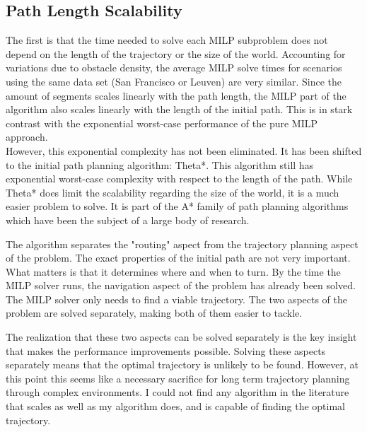 \subsection{Path Length Scalability}
The first is that the time needed to solve each MILP subproblem does not depend on the length of the trajectory or the size of the world. Accounting for variations due to obstacle density, the average MILP solve times for scenarios using the same data set (San Francisco or Leuven) are very similar. Since the amount of segments scales linearly with the path length, the MILP part of the algorithm also scales linearly with the length of the initial path. This is in stark contrast with the exponential worst-case performance of the pure MILP approach.\\
However, this exponential complexity has not been eliminated. It has been shifted to the initial path planning algorithm: Theta*. This algorithm still has exponential worst-case complexity with respect to the length of the path. While Theta* does limit the scalability regarding the size of the world, it is a much easier problem to solve. It is part of the A* family of path planning algorithms which have been the subject of a large body of research.
\par
The algorithm separates the "routing" aspect from the trajectory planning aspect of the problem. The exact properties of the initial path are not very important. What matters is that it determines where and when to turn. By the time the MILP solver runs, the navigation aspect of the problem has already been solved. The MILP solver only needs to find a viable trajectory. The two aspects of the problem are solved separately, making both of them easier to tackle.
\par
The realization that these two aspects can be solved separately is the key insight that makes the performance improvements possible. Solving these aspects separately means that the optimal trajectory is unlikely to be found. However, at this point this seems like a necessary sacrifice for long term trajectory planning through complex environments. I could not find any algorithm in the literature that scales as well as my algorithm does, and is capable  of finding the optimal trajectory.


